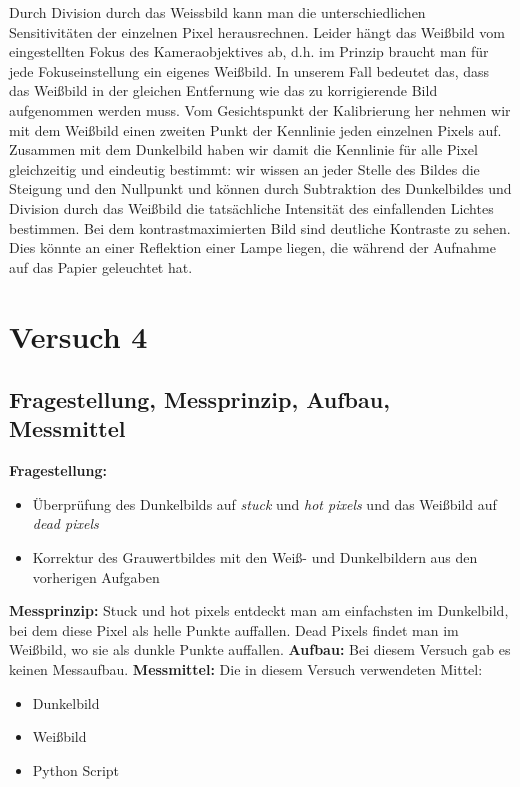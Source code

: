 \documentclass[12pt, oneside, a4paper, \docLanguage]{report}
\begin{document}
\begin{normalsize}
Durch Division durch das Weissbild kann man
die unterschiedlichen Sensitivitäten der einzelnen Pixel herausrechnen. Leider hängt das
Weißbild vom eingestellten Fokus des Kameraobjektives ab, d.h. im Prinzip braucht man für
jede Fokuseinstellung ein eigenes Weißbild. In unserem Fall bedeutet das, dass das Weißbild
in der gleichen Entfernung wie das zu korrigierende Bild aufgenommen werden muss.
Vom Gesichtspunkt der Kalibrierung her nehmen wir mit dem Weißbild einen zweiten Punkt
der Kennlinie jeden einzelnen Pixels auf. Zusammen mit dem Dunkelbild haben wir damit
die Kennlinie für alle Pixel gleichzeitig und eindeutig bestimmt: wir wissen an jeder Stelle des
Bildes die Steigung und den Nullpunkt und können durch Subtraktion des Dunkelbildes und
Division durch das Weißbild die tatsächliche Intensität des einfallenden Lichtes bestimmen.
Bei dem kontrastmaximierten Bild sind deutliche Kontraste zu sehen. Dies könnte an einer Reflektion einer Lampe liegen, die während der Aufnahme auf das Papier geleuchtet hat.\newline
\end{normalsize}

%
%
\chapter{Versuch 4}
\label{chap:VERSUCH_4}

\section{Fragestellung, Messprinzip, Aufbau, Messmittel}
\label{chap:VERSUCH_4_FRAGESTELLUNG}
\begin{normalsize}
\textbf{Fragestellung:}
\begin{itemize}
\item Überprüfung des Dunkelbilds auf \textit{stuck} und \textit{hot pixels} und das Weißbild auf \textit{dead pixels}
\item Korrektur des Grauwertbildes mit den Weiß- und Dunkelbildern aus den vorherigen Aufgaben
\end{itemize}
\textbf{Messprinzip:}\newline
Stuck und hot pixels entdeckt man am
einfachsten im Dunkelbild, bei dem diese Pixel als helle Punkte auffallen. Dead Pixels findet
man im Weißbild, wo sie als dunkle Punkte auffallen.\newline
\textbf{Aufbau:}\newline
Bei diesem Versuch gab es keinen Messaufbau.\newline
\textbf{Messmittel:}\newline
Die in diesem Versuch verwendeten Mittel:
\begin{itemize}
\item Dunkelbild
\item Weißbild
\item Python Script
\end{itemize}
\end{normalsize}
\end{document}

